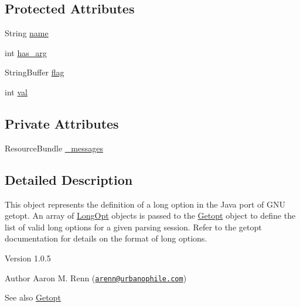 \subsection*{Protected Attributes}
\begin{DoxyCompactItemize}
\item 
String \hyperlink{classgnu_1_1getopt_1_1_long_opt_a4b2a1686f77ce6aa2e36673cf0b074d9}{name}
\item 
int \hyperlink{classgnu_1_1getopt_1_1_long_opt_a7a8d529950461c0c30ef2df667df017b}{has\_\-arg}
\item 
StringBuffer \hyperlink{classgnu_1_1getopt_1_1_long_opt_ac9a762144573588ca158d909f65c03e9}{flag}
\item 
int \hyperlink{classgnu_1_1getopt_1_1_long_opt_aee56b4420df0cbd0f69788c7e4a3c57a}{val}
\end{DoxyCompactItemize}
\subsection*{Private Attributes}
\begin{DoxyCompactItemize}
\item 
ResourceBundle \hyperlink{classgnu_1_1getopt_1_1_long_opt_af5966405b1f9dff812b8ee0641a4c13f}{\_\-messages}
\end{DoxyCompactItemize}


\subsection{Detailed Description}
This object represents the definition of a long option in the Java port of GNU getopt. An array of \hyperlink{classgnu_1_1getopt_1_1_long_opt}{LongOpt} objects is passed to the \hyperlink{classgnu_1_1getopt_1_1_getopt}{Getopt} object to define the list of valid long options for a given parsing session. Refer to the getopt documentation for details on the format of long options.

\begin{DoxyVersion}{Version}
1.0.5 
\end{DoxyVersion}
\begin{DoxyAuthor}{Author}
Aaron M. Renn (\href{mailto:arenn@urbanophile.com}{\tt arenn@urbanophile.com})
\end{DoxyAuthor}
\begin{DoxySeeAlso}{See also}
\hyperlink{classgnu_1_1getopt_1_1_getopt}{Getopt} 
\end{DoxySeeAlso}


